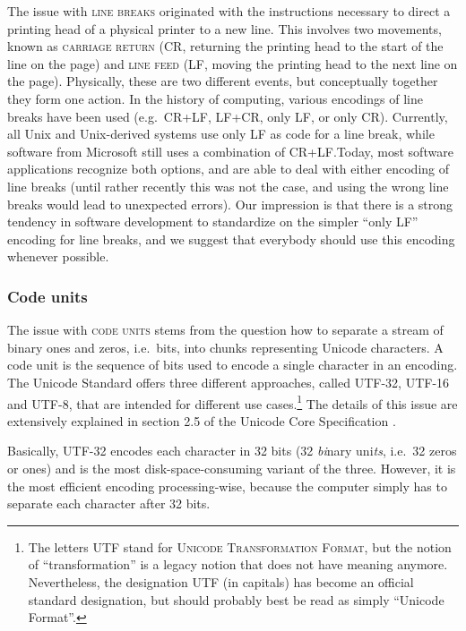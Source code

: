 The issue with \textsc{line breaks} originated with the instructions necessary
to direct a printing head of a physical printer to a new line. This involves two
movements, known as \textsc{carriage return} (CR, returning the printing head to
the start of the line on the page) and \textsc{line feed} (LF, moving the
printing head to the next line on the page). Physically, these are two different
events, but conceptually together they form one action. In the history of
computing, various encodings of line breaks have been used (e.g.~CR+LF, LF+CR,
only LF, or only CR). Currently, all Unix and Unix-derived systems use only LF
as code for a line break, while software from Microsoft still uses a combination
of CR+LF.\@ Today, most software applications recognize both options, and
are able to deal with either encoding of line breaks (until rather recently this
was not the case, and using the wrong line breaks would lead to unexpected
errors). Our impression is that there is a strong tendency in software
development to standardize on the simpler ``only LF'' encoding for line
breaks, and we suggest that everybody should use this encoding whenever possible.

\subsubsection*{Code units}

The issue with \textsc{code units} stems from the question how to separate a
stream of binary ones and zeros, i.e.~bits, into chunks representing Unicode
characters. A code unit is the sequence of bits used to encode a single
character in an encoding. The Unicode Standard offers three different approaches, 
called UTF-32, UTF-16 and UTF-8, that are intended for different use cases.\footnote{The
letters UTF stand for \textsc{Unicode Transformation Format}, but the notion of
``transformation'' is a legacy notion that does not have meaning anymore.
Nevertheless, the designation UTF (in capitals) has become an official
standard designation, but should probably best be read as simply ``Unicode
Format''.} The details of this issue are extensively explained in section 2.5 of
the Unicode Core Specification \citep{Unicode2018}. 

Basically, \textsc{UTF-32} encodes each character in 32 bits (32 \textit{bi}nary
uni\textit{ts}, i.e.~32 zeros or ones) and is the most disk-space-consuming
variant of the three. However, it is the most efficient encoding
processing-wise, because the computer simply has to separate each character
after 32 bits. 

